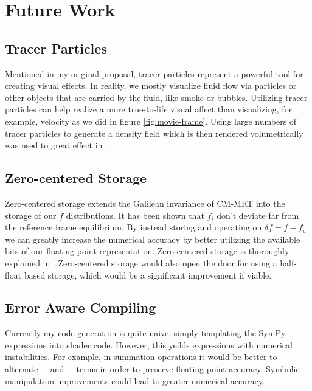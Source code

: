 \section{Future Work}\label{sec:futurework}
\subsection{Tracer Particles}
Mentioned in my original proposal, tracer particles
represent a powerful tool for creating visual effects.
In reality, we mostly visualize fluid flow via particles or
other objects that are carried by the fluid, like smoke or bubbles.
Utilizing tracer particles can help realize a more true-to-life
visual affect than visualizing, for example, velocity as we did in
figure \ref{fig:movie-frame}.
Using large numbers of tracer particles to generate a 
density field which is then rendered volumetrically was used to 
great effect in \cite{Li2020, Li2024, Lyu2021}.

\subsection{Zero-centered Storage}
Zero-centered storage extends the Galilean invariance of CM-MRT 
into the storage of our $f$ distributions.
It has been shown that $f_i$ don't deviate far from the reference
frame equilibrium.
By instead storing and operating on $\delta f = f - f_u$ 
we can greatly increase the numerical accuracy by better
utilizing the available bits of our floating point representation.
Zero-centered storage is thoroughly explained in \cite{Hennig2023}.
Zero-centered storage would also open the door for using a half-float 
based storage, which would be a significant improvement if viable.

\subsection{Error Aware Compiling}
Currently my code generation is quite naive, simply
templating the SymPy expressions into shader code.
However, this yeilds expressions with numerical instabilities.
For example, in summation operations it would be better to alternate
$+$ and $-$ terms in order to preserve floating point accuracy.
Symbolic manipulation improvements could lead to greater numerical 
accuracy.

